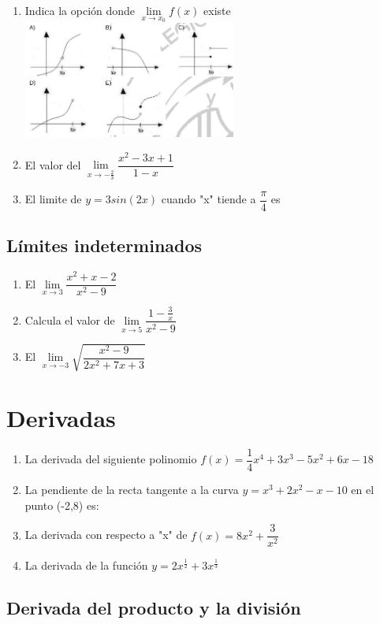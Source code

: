 \documentclass[10pt,a4paper]{article}
\begin{document}
\begin{multicols*}{2}
        \begin{enumerate}
			\item Indica la opción donde $\lim\limits_{x \to x_0} f(x)$ existe		
			\includegraphics[width=7cm]{img/s4-6}
			\item El valor del $\lim\limits_{x \to -\frac{2}{3}} \dfrac{x^2-3x+1}{1-x}$
			\item El limite de $y = 3 sin(2x)$ cuando "x" tiende a $\dfrac{\pi}{4}$ es
        \end{enumerate}
        
        \subsection{Límites indeterminados}
        
        \begin{enumerate}
        	\item El $\lim\limits_{x \to 3} \dfrac{x^2+x-2}{x^2-9}$
        	\item Calcula el valor de $\lim\limits_{x \to 5} \dfrac{1-\frac{3}{x}}{x^2-9}$
        	\item El $\lim\limits_{x \to -3} \sqrt{\dfrac{x^2-9}{2x^2+7x+3}}$
        \end{enumerate}
        
	\section{Derivadas}
	\begin{enumerate}
		\item La derivada del siguiente polinomio $f(x) = \dfrac{1}{4}x^4+3x^3-5x^2+6x-18$
		\item La pendiente de la recta tangente a la curva $y = x^3+2x^2-x-10$ en el punto (-2,8) es:
		\item La derivada con respecto a "x" de $f(x) = 8x^2 + \dfrac{3}{x^2}$
		\item La derivada de la función $y = 2x^{\frac{1}{2}}+3x^{\frac{1}{3}}$
	\end{enumerate}
	
	\subsection{Derivada del producto y la división}
	

\end{multicols*}
\end{document}
